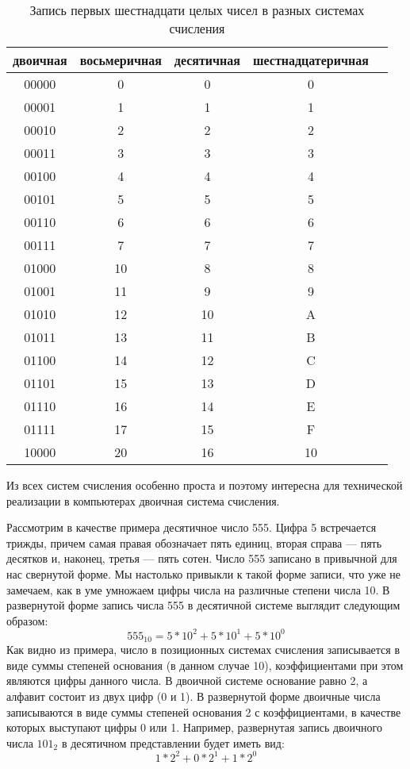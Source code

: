 \documentclass[a4paper]{article}
\begin{document}
\begin{table}\label{table:nums}
\caption{Запись первых шестнадцати целых чисел в разных системах счисления}
      \begin{center}
      \begin{tabular}{c * {4}{c}}
        \toprule
        двоичная & восьмеричная & десятичная & шестнадцатеричная \\
        \toprule
        00000 & 0 & 0 & 0 \\
        00001 & 1 & 1 & 1 \\
        00010 & 2 & 2 & 2 \\
        00011 & 3 & 3 & 3 \\
        00100 & 4 & 4 & 4 \\
        00101 & 5 & 5 & 5 \\
        00110 & 6 & 6 & 6 \\
        00111 & 7 & 7 & 7 \\
        01000 & 10 & 8 & 8 \\
        01001 & 11 & 9 & 9 \\
        01010 & 12 & 10 & A \\
        01011 & 13 & 11 & B \\
        01100 & 14 & 12 & C \\
        01101 & 15 & 13 & D \\
        01110 & 16 & 14 & E \\
        01111 & 17 & 15 & F \\
        10000 & 20 & 16 & 10 \\
        \bottomrule
      \end{tabular}
      \end{center}
    \end{table}

Из всех систем счисления особенно проста и поэтому интересна для технической реализации в компьютерах двоичная система счисления.

Рассмотрим в качестве примера десятичное число 555. Цифра 5 встречается трижды, причем самая правая обозначает пять единиц, вторая справа — пять десятков и, наконец, третья — пять сотен. Число 555 записано в привычной для нас свернутой форме. Мы настолько привыкли к такой форме записи, что уже не замечаем, как в уме умножаем цифры числа на различные степени числа 10. В развернутой форме запись числа 555 в десятичной системе выглядит следующим образом:
$$555_{10} = 5 * 10^{2} + 5 * 10^{1} + 5 * 10^{0}$$
Как видно из примера, число в позиционных системах счисления записывается в виде суммы степеней основания (в данном случае 10), коэффициентами при этом являются цифры данного числа. В двоичной системе основание равно 2, а алфавит состоит из двух цифр (0 и 1). В развернутой форме двоичные числа записываются в виде суммы степеней основания 2 с коэффициентами, в качестве которых выступают цифры 0 или 1. Например, развернутая запись двоичного числа $101_{2}$ в десятичном представлении будет иметь вид:
$$1 * 2^{2} + 0 * 2^{1} + 1 * 2^{0}$$
\end{document}
